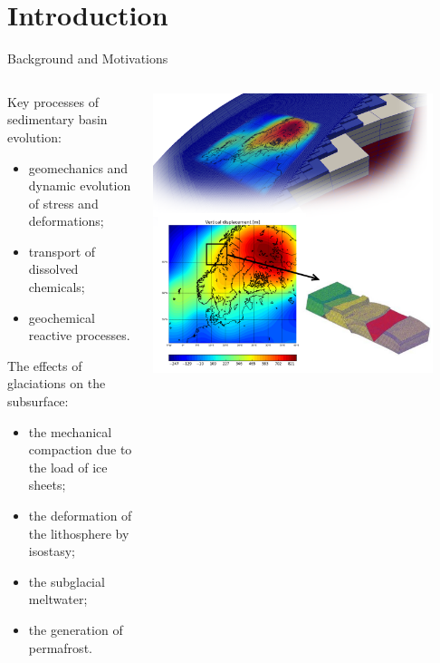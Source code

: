\documentclass{beamer}
\begin{document}
\section{Introduction}
\begin{frame}{Background and Motivations}
\begin{columns}
\begin{column}{0.65\textwidth}
\begin{block}{Key processes of sedimentary basin evolution:} 
\begin {itemize}
\item  geomechanics and dynamic evolution of stress and deformations; 
\item  transport of dissolved chemicals; 
\item geochemical reactive processes.
\end{itemize}
\end{block}
\begin{block}{The effects of glaciations on the subsurface:} 
\begin {itemize}
\item  the mechanical compaction due to the load of ice sheets; 
\item  the deformation of the lithosphere by isostasy; 
\item  the subglacial meltwater; 
\item  the generation of permafrost. 
\end{itemize}
\end{block}
\end{column}
\begin{column}{0.35\textwidth}
\includegraphics[width=0.9\textwidth]{figure/intro1}

\end{column}
\end{columns}
\end{frame}
\end{document}
